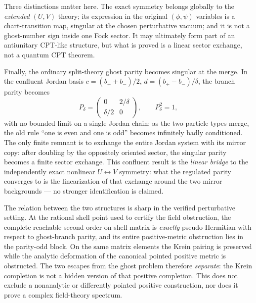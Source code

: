 \documentclass[11pt]{article}
\theoremstyle{remark}
\begin{document}
Three distinctions matter here.  The exact symmetry belongs globally to
the \emph{extended} $(U,V)$ theory; its expression in the original
$(\phi,\psi)$ variables is a chart-transition map, singular at the
chosen perturbative vacuum; and it is not a ghost-number sign inside
one Fock sector.  It may ultimately form part of an antiunitary
CPT-like structure, but what is proved is a linear sector exchange, not
a quantum CPT theorem.

Finally, the ordinary split-theory ghost parity becomes singular at the
merge.  In the confluent Jordan basis $c=(b_++b_-)/2$,
$d=(b_+-b_-)/\delta$, the branch parity becomes
\begin{equation}
P_\delta=
\begin{pmatrix}0&2/\delta\\ \delta/2&0\end{pmatrix},
\qquad P_\delta^2=1,
\end{equation}
with no bounded limit on a single Jordan chain: as the two particle
types merge, the old rule ``one is even and one is odd'' becomes
infinitely badly conditioned.  The only finite remnant is to exchange
the entire Jordan system with its mirror copy: after doubling by the
oppositely oriented sector, the singular parity becomes a finite sector
exchange.  This confluent result is the \emph{linear bridge} to the
independently exact nonlinear $U\leftrightarrow V$ symmetry: what the
regulated parity converges to is the linearization of that exchange
around the two mirror backgrounds --- no stronger identification is
claimed.

The relation between the two structures is sharp in the verified
perturbative setting.  At the rational shell point used to certify the
field obstruction, the complete reachable second-order on-shell matrix is
\emph{exactly} pseudo-Hermitian with respect to ghost-branch parity, and
its entire positive-metric obstruction lies in the parity-odd block.  On
the same matrix elements the Krein pairing is preserved while the analytic
deformation of the canonical pointed positive metric is obstructed.  The
two escapes from the ghost problem therefore \emph{separate}: the Krein
completion is not a hidden version of that positive completion.  This does
not exclude a nonanalytic or differently pointed positive construction,
nor does it prove a complex field-theory spectrum.
\end{document}

